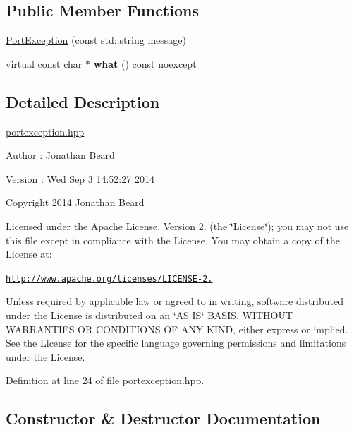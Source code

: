 \subsection*{Public Member Functions}
\begin{DoxyCompactItemize}
\item 
\hyperlink{class_port_exception_aec6ea14772ec4e06739ca2ae87115cbf}{Port\+Exception} (const std\+::string message)
\item 
\hypertarget{class_port_exception_adbdbaf084975880c9ba5d478c51a6273}{}\label{class_port_exception_adbdbaf084975880c9ba5d478c51a6273} 
virtual const char $\ast$ {\bfseries what} () const noexcept
\end{DoxyCompactItemize}


\subsection{Detailed Description}
\hyperlink{portexception_8hpp_source}{portexception.\+hpp} -\/ \begin{DoxyAuthor}{Author}
\+: Jonathan Beard 
\end{DoxyAuthor}
\begin{DoxyVersion}{Version}
\+: Wed Sep 3 14\+:52\+:27 2014
\end{DoxyVersion}
Copyright 2014 Jonathan Beard

Licensed under the Apache License, Version 2. (the \char`\"{}\+License\char`\"{}); you may not use this file except in compliance with the License. You may obtain a copy of the License at\+:

\href{http://www.apache.org/licenses/LICENSE-2.0}{\tt http\+://www.\+apache.\+org/licenses/\+L\+I\+C\+E\+N\+S\+E-\/2.}

Unless required by applicable law or agreed to in writing, software distributed under the License is distributed on an \char`\"{}\+A\+S I\+S\char`\"{} B\+A\+S\+IS, W\+I\+T\+H\+O\+UT W\+A\+R\+R\+A\+N\+T\+I\+ES OR C\+O\+N\+D\+I\+T\+I\+O\+NS OF A\+NY K\+I\+ND, either express or implied. See the License for the specific language governing permissions and limitations under the License. 

Definition at line 24 of file portexception.\+hpp.



\subsection{Constructor \& Destructor Documentation}
\hypertarget{class_port_exception_aec6ea14772ec4e06739ca2ae87115cbf}{}\label{class_port_exception_aec6ea14772ec4e06739ca2ae87115cbf} 
